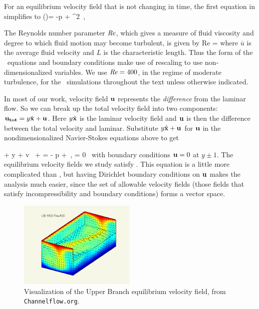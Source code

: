 \documentclass[letter,12pt,openany]{article}
\begin{document}
For an equilibrium velocity field that is not changing in time, the first equation in
 simplifies to \beq
 (\bu \cdot \nabla)\bu = -\nabla p +  \nabla^{2} \bu
    \,,\qquad \label{eqn:NavierStokes2} \eeq
 
  The Reynolds number parameter $\textit{Re}$, which gives a measure of fluid viscosity and degree to which fluid motion may become turbulent, is given by \beq Re = 
\eeq where $\overline{u}$ is the average fluid velocity and $L$ is
the characteristic length. Thus the form of the \NS\ equations and boundary conditions make use of rescaling to use non-dimensionalized variables. 
We use $\textit{Re} = 400$, in the regime of moderate turbulence, for the \pCf\ simulations throughout the text unless otherwise indicated.

In most of our work, velocity field  ${\bf u}$
represents the {\em difference} from the laminar flow. 
So we can break up the total velocity field into two components: ${\bf u_{tot}} =
y \hat{\bf x} + {\bf u}$. Here $y \hat{\bf x}$ is the laminar velocity
field and ${\bf u}$ is then the difference between the total velocity and
laminar. Substitute $y \hat{\bf x} + {\bf u}$ for ${\bf u}$ in the
nondimensionalized Navier-Stokes equations above to get

\beq
    + y  
    + v \, 
    + \bu \cdot \bnabla \bu
=
    - \bnabla p
    + 
        \lapl \bu  \,, \quad \nabla \cdot \bu = 0
\, \label{NavStokesDiff}
\eeq
with boundary conditions ${\bf u} = 0 $ at $y \pm 1$.
The equilibrium velocity fields we study satisfy . This equation is a little more complicated than
, but having Dirichlet boundary conditions on
${\bf u}$ makes the analysis much easier, since the set of allowable velocity fields (those fields that satisfy incompressibility and boundary
conditions)
forms a vector space. \\


\begin{figure}[!h]
 \begin{center} 
\includegraphics[width=0.5\textwidth]{figs/eq2.png}
  \caption{
   Visualization of the Upper Branch equilibrium velocity field, from {\tt Channelflow.org}.
   }
  \label{eltonFig:UB}
  \end{center}
 \end{figure}
\end{document}
